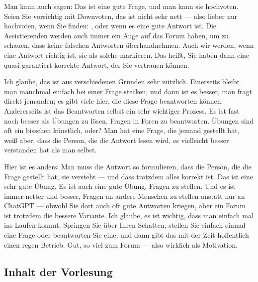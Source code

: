 \begin{spoken-clean}[00:16:30 - 00:18:50]
Man kann auch sagen: Das ist eine gute Frage, und man kann sie hochvoten. Seien Sie vorsichtig mit Downvoten, das ist nicht sehr nett --- also lieber nur hochvoten, wenn Sie finden: , oder wenn es eine gute Antwort ist. Die Assistierenden werden auch immer ein Auge auf das Forum haben, um zu schauen, dass keine falschen Antworten überhandnehmen. Auch wir werden, wenn eine Antwort richtig ist, sie als solche markieren. Das heißt, Sie haben dann eine quasi garantiert korrekte Antwort, der Sie vertrauen können.

Ich glaube, das ist aus verschiedenen Gründen sehr nützlich. Einerseits bleibt man manchmal einfach bei einer Frage stecken, und dann ist es besser, man fragt direkt jemanden; es gibt viele hier, die diese Frage beantworten können. Andererseits ist das Beantworten selbst ein sehr wichtiger Prozess. Es ist fast noch besser als Übungen zu lösen, Fragen in Foren zu beantworten. Übungen sind oft ein bisschen künstlich, oder? Man hat eine Frage, die jemand gestellt hat, weiß aber, dass die Person, die die Antwort lesen wird, es vielleicht besser verstanden hat als man selbst. 

Hier ist es anders: Man muss die Antwort so formulieren, dass die Person, die die Frage gestellt hat, sie versteht --- und dass trotzdem alles korrekt ist. Das ist eine sehr gute Übung. Es ist auch eine gute Übung, Fragen zu stellen. Und es ist immer netter und besser, Fragen an andere Menschen zu stellen anstatt nur an ChatGPT --- obwohl Sie dort auch oft gute Antworten kriegen, aber ein Forum ist trotzdem die bessere Variante. Ich glaube, es ist wichtig, dass man einfach mal ins Laufen kommt. Springen Sie über Ihren Schatten, stellen Sie einfach einmal eine Frage oder beantworten Sie eine, und dann gibt das mit der Zeit hoffentlich einen regen Betrieb. Gut, so viel zum Forum --- also wirklich als Motivation.
\end{spoken-clean}

\begin{ai-global-state-checkpoint-invisible-content}
\end{ai-global-state-checkpoint-invisible-content}

\subsection{Inhalt der Vorlesung}

